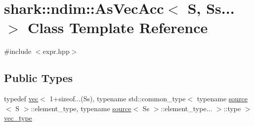 \hypertarget{classshark_1_1ndim_1_1_as_vec_acc_3_01_s_00_01_ss_8_8_8_01_4}{}\section{shark\+:\+:ndim\+:\+:As\+Vec\+Acc$<$ S, Ss... $>$ Class Template Reference}
\label{classshark_1_1ndim_1_1_as_vec_acc_3_01_s_00_01_ss_8_8_8_01_4}


{\ttfamily \#include $<$expr.\+hpp$>$}

\subsection*{Public Types}
\begin{DoxyCompactItemize}
\item 
typedef \hyperlink{structshark_1_1ndim_1_1vec}{vec}$<$ 1+sizeof...(Ss), typename std\+::common\+\_\+type$<$ typename \hyperlink{structshark_1_1ndim_1_1source}{source}$<$ S $>$\+::element\+\_\+type, typename \hyperlink{structshark_1_1ndim_1_1source}{source}$<$ Ss $>$\+::element\+\_\+type... $>$\+::type $>$ \hyperlink{classshark_1_1ndim_1_1_as_vec_acc_3_01_s_00_01_ss_8_8_8_01_4_acc514ee9d40c54ec227d44759ce80e34}{vec\+\_\+type}
\end{DoxyCompactItemize}
